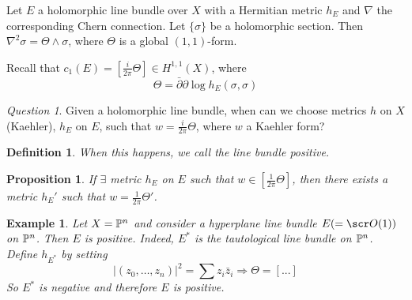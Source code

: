 \documentclass[A4paper, british, reqno]{amsart}
\theoremstyle{darkgreentheorem}
\newtheorem{prop}[thm]{Proposition}
\theoremstyle{darkbluedefinition}
\newtheorem{defn}[thm]{Definition}
\theoremstyle{darkredexample}
\newtheorem{exa}[thm]{Example}
\theoremstyle{remark}
\newtheorem{q}[thm]{Question}
\newcommand{\1}{\mathbbm{1}}
\begin{document}
Let $E$ a holomorphic line bundle over $X$ with a Hermitian metric $h_{E}$ and $\nabla$ the corresponding Chern connection.
Let $\{\sigma \}$ be a holomorphic section.
Then $\nabla^{2}\sigma=\Theta \wedge \sigma $, where $\Theta $ is a global $(1,1)$-form.

Recall that $c_{1}(E)=[\frac{i}{2\pi}\Theta ]\in H^{1,1}(X)$, where
\[ \Theta=\bar{\partial}\partial \log h_{E}(\sigma, \sigma) \]

\begin{q}
    Given a holomorphic line bundle, when can we choose metrics $h$ on $X$ (Kaehler), $h_{E}$ on $E$, such that $w=\frac{i}{2\pi}\Theta $, where $w$ a Kaehler form?
\end{q}

\begin{defn}
    When this happens, we call the line bundle \textit{positive}.
\end{defn}

\begin{prop}
    If $\exists$ metric $h_{E}$ on $E$ such that $w\in [\frac{1}{2\pi}\Theta ]$, then there exists a metric $h_{E}'$ such that $w=\frac{1}{2\pi}\Theta'$.
\end{prop}

\begin{exa}
    Let $X=\P^{n}$ and consider a hyperplane line bundle $E(=\O(1))$ on $\P^{n}$.
    Then $E$ is positive.
    Indeed, $E^{*}$ is the tautological line bundle on $\P^{n}$.
    Define $h_{E^{*}}$ by setting
    \[ |(z_{0},\ldots,z_{n})|^{2}=\sum z_{i}\bar{z}_{i} \Rightarrow \Theta= [...]\]
    So $E^{*}$ is negative and therefore $E$ is positive.
\end{exa}
\end{document}
